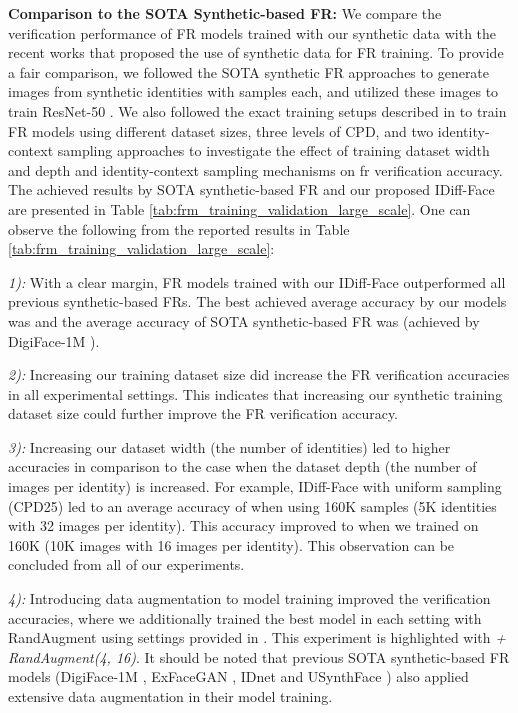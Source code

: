 \documentclass[10pt,twocolumn,letterpaper]{article}
\newcommand{\approachname}{IDiff-Face }
\begin{document}
\textbf{Comparison to the SOTA Synthetic-based FR:}
We compare the verification performance of FR models trained with our synthetic data with the recent works that proposed the use of synthetic data for FR training. To provide a fair comparison, we followed the SOTA synthetic FR approaches \cite{Qiu2021,Boutros2022SFace,FBoutros2022USynthFace} to generate  images from  synthetic identities with  samples each, and utilized these images to train ResNet-50 \cite{ResNet}. We also followed the exact training setups described in \cite{FBoutros2022USynthFace} to train  FR models using different dataset sizes, three levels of CPD, and two identity-context sampling approaches to investigate the effect of training dataset width and depth and identity-context sampling mechanisms on \acrshort{fr} verification accuracy. The achieved results by SOTA synthetic-based FR and our proposed \approachname are presented in Table \ref{tab:frm_training_validation_large_scale}. One can observe the following from the reported results in Table \ref{tab:frm_training_validation_large_scale}:


\textit{1):} With a clear margin, FR models trained with our \approachname outperformed all previous synthetic-based FRs. The best achieved average accuracy by our models was  and the average accuracy of SOTA synthetic-based FR was  (achieved by DigiFace-1M \cite{DigiFace1M}).


\textit{2):} Increasing our training dataset size did increase the FR verification accuracies in all experimental settings. This indicates that increasing our synthetic training dataset size could further improve the FR verification accuracy.


\textit{3):} Increasing our dataset width (the number of identities) led to higher accuracies in comparison to the case when the dataset depth (the number of images per identity) is increased. For example, \approachname with uniform sampling (CPD25) led to an average accuracy of  when using 160K samples (5K identities with 32 images per identity). This accuracy improved to  when we trained on 160K (10K images with 16 images per identity). This observation can be concluded from all of our experiments. 


\textit{4):} Introducing data augmentation \cite{FBoutros2022USynthFace} to model training improved the verification accuracies, where we additionally trained the best model in each setting with RandAugment \cite{RandAugment} using settings provided in \cite{FBoutros2022USynthFace}. This experiment is highlighted with \textit{+ RandAugment(4, 16)}. It should be noted that previous SOTA synthetic-based FR models (DigiFace-1M \cite{DigiFace1M}, ExFaceGAN \cite{ExFaceGAN}, IDnet \cite{IDnet} and USynthFace \cite{FBoutros2022USynthFace}) also applied extensive data augmentation in their model training.
\end{document}
